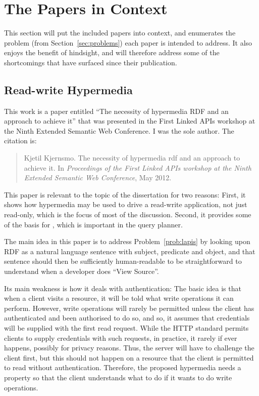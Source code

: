 \section{The Papers in Context}\label{sec:papersincontext}

This section will put the included papers into context, and enumerates
the problem (from Section~\ref{sec:problems}) each paper is intended
to address. It also enjoys the benefit of hindsight, and will
therefore address some of the shortcomings that have surfaced since
their publication.

\subsection{Read-write Hypermedia}\label{sec:conlapis}

This work is a paper entitled ``The necessity of hypermedia RDF and an
approach to achieve it'' that was presented in the First Linked APIs
workshop at the Ninth Extended Semantic Web Conference. I was the sole
author. The citation is:

\begin{quote}
Kjetil Kjernsmo.
\newblock The necessity of hypermedia rdf and an approach to achieve it.
\newblock In {\em Proceedings of the First Linked APIs workshop at the Ninth
  Extended Semantic Web Conference}, May 2012.
\end{quote}

This paper is relevant to the topic of the dissertation for two
reasons: First, it shows how hypermedia may be used to drive a
read-write application, not just read-only, which is the focus of most
of the discussion. Second, it provides some of the basis for
\cite{ldf1}, which is important in the query planner.

The main idea in this paper is to address Problem~\ref{prob:lapis} 
by looking upon RDF as a natural language
sentence with subject, predicate and object, and that sentence should
then be sufficiently human-readable to be straightforward to
understand when a developer does ``View Source''.

Its main weakness is how it deals with authentication: The basic idea
is that when a client visits a resource, it will be told what
write operations it can perform. However, write operations will rarely
be permitted unless the client has authenticated and been authorised
to do so, and so, it assumes that credentials will be supplied with
the first read request. While the HTTP standard permits clients to
supply credentials with such requests, in practice, it rarely if ever
happens, possibly for privacy reasons. Thus, the server will have to
challenge the client first, but this should not happen on a resource
that the client is permitted to read without authentication. 
Therefore, the proposed hypermedia needs a property so that the client
understands what to do if it wants to do write operations.

